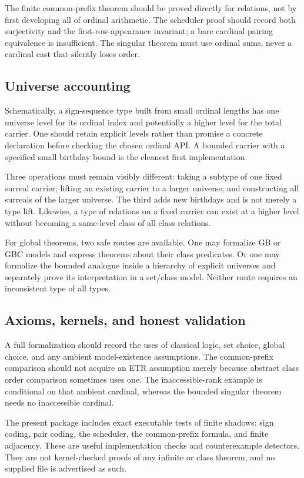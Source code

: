 \documentclass[11pt]{article}
\theoremstyle{definition}
\theoremstyle{remark}
\begin{document}
The finite common-prefix theorem should be proved directly for relations,
not by first developing all of ordinal arithmetic. The scheduler proof
should record both surjectivity and the first-row-appearance invariant;
a bare cardinal pairing equivalence is insufficient. The singular theorem
must use ordinal sums, never a cardinal cast that silently loses order.

\subsection{Universe accounting}

Schematically, a sign-sequence type built from small ordinal lengths has
one universe level for its ordinal index and potentially a higher level
for the total carrier. One should retain explicit levels rather than
promise a concrete declaration before checking the chosen ordinal API.
A bounded carrier with a specified small birthday bound is the cleanest
first implementation.

Three operations must remain visibly different: taking a subtype of one
fixed surreal carrier; lifting an existing carrier to a larger universe;
and constructing all surreals of the larger universe. The third adds new
birthdays and is not merely a type lift. Likewise, a type of relations on
a fixed carrier can exist at a higher level without becoming a same-level
class of all class relations.

For global theorems, two safe routes are available. One may formalize GB
or GBC models and express theorems about their class predicates. Or one
may formalize the bounded analogue inside a hierarchy of explicit
universes and separately prove its interpretation in a set/class model.
Neither route requires an inconsistent type of all types.

\subsection{Axioms, kernels, and honest validation}

A full formalization should record the uses of classical logic, set
choice, global choice, and any ambient model-existence assumptions.
The common-prefix comparison should not acquire an ETR assumption merely
because abstract class order comparison sometimes uses one.
The inaccessible-rank example is conditional on that ambient cardinal,
whereas the bounded singular theorem needs no inaccessible cardinal.

The present package includes exact executable tests of finite shadows:
sign coding, pair coding, the scheduler, the common-prefix formula, and
finite adjacency. These are useful implementation checks and
counterexample detectors. They are not kernel-checked proofs of any
infinite or class theorem, and no supplied file is advertised as such.
\end{document}
